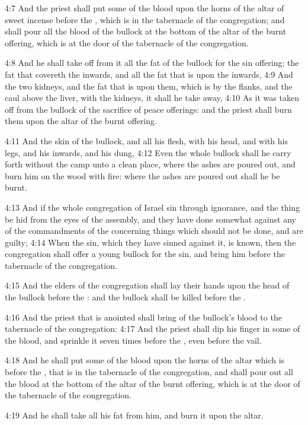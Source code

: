 4:7 And the priest shall put some of the blood upon the horns of the altar of sweet incense before the \LORD, which is in the tabernacle of the congregation; and shall pour all the blood of the bullock at the bottom of the altar of the burnt offering, which is at the door of the tabernacle of the congregation.

4:8 And he shall take off from it all the fat of the bullock for the sin offering; the fat that covereth the inwards, and all the fat that is upon the inwards, 4:9 And the two kidneys, and the fat that is upon them, which is by the flanks, and the caul above the liver, with the kidneys, it shall he take away, 4:10 As it was taken off from the bullock of the sacrifice of peace offerings: and the priest shall burn them upon the altar of the burnt offering.

4:11 And the skin of the bullock, and all his flesh, with his head, and with his legs, and his inwards, and his dung, 4:12 Even the whole bullock shall he carry forth without the camp unto a clean place, where the ashes are poured out, and burn him on the wood with fire: where the ashes are poured out shall he be burnt.

4:13 And if the whole congregation of Israel sin through ignorance, and the thing be hid from the eyes of the assembly, and they have done somewhat against any of the commandments of the \LORD concerning things which should not be done, and are guilty; 4:14 When the sin, which they have sinned against it, is known, then the congregation shall offer a young bullock for the sin, and bring him before the tabernacle of the congregation.

4:15 And the elders of the congregation shall lay their hands upon the head of the bullock before the \LORD: and the bullock shall be killed before the \LORD.

4:16 And the priest that is anointed shall bring of the bullock's blood to the tabernacle of the congregation: 4:17 And the priest shall dip his finger in some of the blood, and sprinkle it seven times before the \LORD, even before the vail.

4:18 And he shall put some of the blood upon the horns of the altar which is before the \LORD, that is in the tabernacle of the congregation, and shall pour out all the blood at the bottom of the altar of the burnt offering, which is at the door of the tabernacle of the congregation.

4:19 And he shall take all his fat from him, and burn it upon the altar.

